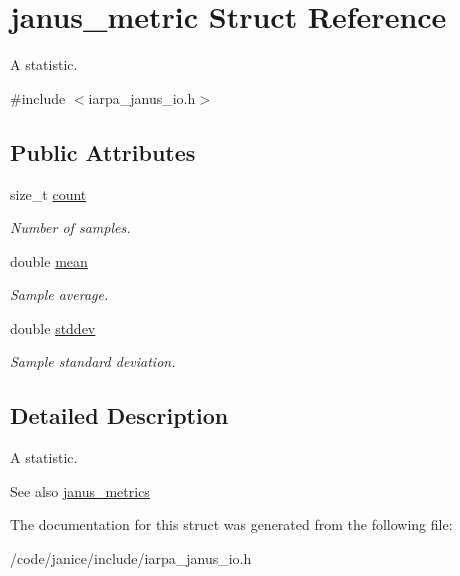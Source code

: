 \hypertarget{structjanus__metric}{}\section{janus\+\_\+metric Struct Reference}
\label{structjanus__metric}


A statistic.  




{\ttfamily \#include $<$iarpa\+\_\+janus\+\_\+io.\+h$>$}

\subsection*{Public Attributes}
\begin{DoxyCompactItemize}
\item 
\hypertarget{structjanus__metric_a86845a95569f86813e82252ed61ab273}{}size\+\_\+t \hyperlink{structjanus__metric_a86845a95569f86813e82252ed61ab273}{count}\label{structjanus__metric_a86845a95569f86813e82252ed61ab273}

\begin{DoxyCompactList}\small\item\em Number of samples. \end{DoxyCompactList}\item 
\hypertarget{structjanus__metric_a5e6e98e632d255655d0ecf8c667d481d}{}double \hyperlink{structjanus__metric_a5e6e98e632d255655d0ecf8c667d481d}{mean}\label{structjanus__metric_a5e6e98e632d255655d0ecf8c667d481d}

\begin{DoxyCompactList}\small\item\em Sample average. \end{DoxyCompactList}\item 
\hypertarget{structjanus__metric_a6d8d90f56c8b95658316fa18d6a62763}{}double \hyperlink{structjanus__metric_a6d8d90f56c8b95658316fa18d6a62763}{stddev}\label{structjanus__metric_a6d8d90f56c8b95658316fa18d6a62763}

\begin{DoxyCompactList}\small\item\em Sample standard deviation. \end{DoxyCompactList}\end{DoxyCompactItemize}


\subsection{Detailed Description}
A statistic. 

\begin{DoxySeeAlso}{See also}
\hyperlink{structjanus__metrics}{janus\+\_\+metrics} 
\end{DoxySeeAlso}


The documentation for this struct was generated from the following file\+:\begin{DoxyCompactItemize}
\item 
/code/janice/include/iarpa\+\_\+janus\+\_\+io.\+h\end{DoxyCompactItemize}
